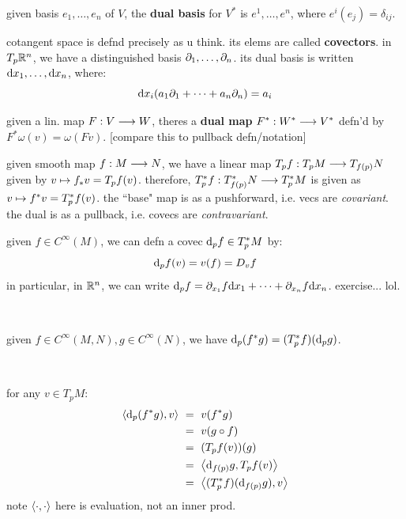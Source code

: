 \begin{defn}
	given basis $e_{1},\dots,e_{n}$ of $V$, the \textbf{dual basis} for $V^{*}$
	is $e^{1},\dots,e^{n}$, where $e^{i}(e_{j})=\delta_{ij}$.
\end{defn}
cotangent space is defnd precisely as u think.
its elems are called \textbf{covectors}.
in $T_{p}\mathbb{R}^{n}$, we have a distinguished basis $\partial_{1},\dots,\partial_{n}$.
its dual basis is written $\textrm{d} x_{1},\dots,\textrm{d} x_{n}$, where:
\begin{equation*}
	\textrm{d} x_{i}(a_{1}\partial_{1}+\dots +a_{n}\partial_{n})=a_{i}
\end{equation*}

\begin{defn}
	given a lin. map $F:V\longrightarrow W$, theres a \textbf{dual map} $F^{*}:W^{*}\longrightarrow V^{*}$
	defn'd by $F^{*}\omega(v)=\omega(Fv)$.
	[compare this to pullback defn/notation]
\end{defn}
given smooth map $f:M\longrightarrow N$, we have a linear map $T_{p}f:T_{p}M\longrightarrow T_{f(p)}N$
given by $v\mapsto f_{*}v=T_{p}f(v)$.
therefore, $T_{p}^{*}f:T_{f(p)}^{*}N\longrightarrow T_{p}^{*}M$ is given as
$v\mapsto f^{*}v=T_{p}^{*}f(v)$.
the ``base" map is as a pushforward, i.e. vecs are \textit{covariant}.
the dual is as a pullback, i.e. covecs are \textit{contravariant}.

\begin{xmp}
	given $f\in C^{\infty}(M)$, we can defn a covec $\textrm{d}_{p}f\in T^{*}_{p}M$ by:
	\begin{equation*}
		\textrm{d}_{p}f(v)=v(f)=D_{v}f
	\end{equation*}
	in particular, in $\mathbb{R}^{n}$, we can write
	$\textrm{d}_{p}f=\partial_{x_{1}}f\textrm{d} x_{1}+\dots +\partial_{x_{n}}f\textrm{d} x_{n}$.
	exercise... lol.
\end{xmp} \

\begin{prop}
	given $f\in C^{\infty}(M,N),g\in C^{\infty}(N)$, we have
	$\textrm{d}_{p}(f^{*}g)=(T_{p}^{*}f)(\textrm{d}_{p}g)$.
\end{prop} \

\begin{pf}
	for any $v\in T_{p}M$:
	\begin{align*}
		\left\langle{\textrm{d}_{p}(f^{*}g),v}\right\rangle
		& \ = \ v(f^{*}g) \\
		& \ = \ v(g\circ f) \\
		& \ = \ (T_{p}f(v))(g) \\
		& \ = \ \left\langle{\textrm{d}_{f(p)}g,T_{p}f(v)}\right\rangle \\
		& \ = \ \left\langle{(T_{p}^{*}f)(\textrm{d}_{f(p)}g),v}\right\rangle
	\end{align*}
	note $\left\langle{\cdot,\cdot}\right\rangle$ here is evaluation, not an inner prod.
\end{pf}


